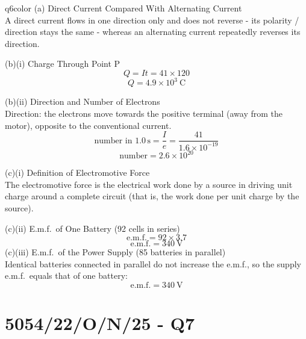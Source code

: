 \documentclass[11pt,a4paper]{article}
\newcommand{\qsection}[1]{\needspace{10\baselineskip}\section*{#1}}
\begin{document}
\begin{ansbox}{q6color}
(a) Direct Current Compared With Alternating Current\\[4pt]
A direct current flows in one direction only and does not reverse - its polarity / direction stays the same - whereas an alternating current repeatedly reverses its direction.

\vspace{4pt}
(b)(i) Charge Through Point P\\[4pt]
\[
Q = It = 41 \times 120
\]
\[
Q = \boxed{4.9 \times 10^{3}\ \mathrm{C}}
\]

\vspace{4pt}
(b)(ii) Direction and Number of Electrons\\[4pt]
Direction: the electrons move towards the positive terminal (away from the motor), opposite to the conventional current.
\[
\text{number in } 1.0\,\mathrm{s} = \frac{I}{e} = \frac{41}{1.6 \times 10^{-19}}
\]
\[
\text{number} = \boxed{2.6 \times 10^{20}}
\]

\vspace{4pt}
(c)(i) Definition of Electromotive Force\\[4pt]
The electromotive force is the electrical work done by a source in driving unit charge around a complete circuit (that is, the work done per unit charge by the source).

\vspace{4pt}
(c)(ii) E.m.f.\ of One Battery (92 cells in series)\\[4pt]
\[
\text{e.m.f.} = 92 \times 3.7
\]
\[
\text{e.m.f.} = \boxed{340\ \mathrm{V}}
\]
\clearpage
\vspace{4pt}
(c)(iii) E.m.f.\ of the Power Supply (85 batteries in parallel)\\[4pt]
Identical batteries connected in parallel do not increase the e.m.f., so the supply e.m.f.\ equals that of one battery:
\[
\text{e.m.f.} = \boxed{340\ \mathrm{V}}
\]
\end{ansbox}

\qsection{5054/22/O/N/25 - Q7}\label{p2_on25:q7}
\end{document}
